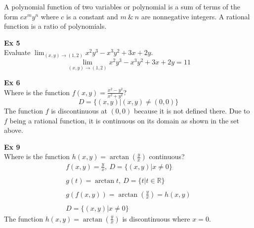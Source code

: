 \documentclass{article}
\begin{document}
 A polynomial function of two variables or polynomial is a sum of terms of the form $ cx^{m}y^{n} $ where $ c $ is a constant and $ m ~\&~ n $ are nonnegative integers. A rational function is a ratio of polynomials.

 \textbf{Ex 5}\\
 Evaluate $ \lim_{(x,y) \to (1,2)} x^{2}y^{3}-x^{3}y^{2}+3x+2y $.
 \[
   \boxed{\lim_{(x,y) \to (1,2)} x^{2}y^{3}-x^{3}y^{2}+3x+2y=11}
 \]

 \textbf{Ex 6}\\
 Where is the function $ f(x,y)=\frac{x^{2}-y^{2}}{x^{2}+y^{2}} $?
 \[
   D=\{ (x,y)|(x,y)\neq (0,0) \}
 \]
 The function $ f $ is discontinuous at $ (0,0) $ because it is not defined there. Due to $ f $ being a rational function, it is continuous on its domain as shown in the set above.

 \textbf{Ex 9}\\
 Where is the function $ h(x,y) = \arctan{(\frac{y}{x})} $ continuous?
 \[
   \begin{gathered}
   f(x,y)=\frac{y}{x},~D=\{ (x,y)| x\neq 0 \}\\
   ~\\
   g(t)=\arctan t,~D=\{ t|t \in \mathbb{R} \}\\
   ~\\
   g(f(x,y))=\arctan{(\frac{y}{x})}=h(x,y)\\
   ~\\
   \boxed{D=\{ (x,y) | x \neq 0 \}} 
   \end{gathered}
 \]
 The function $ h(x,y)=\arctan{(\frac{y}{x} )} $ is discontinuous where $ x=0 $. 
 
\end{document}
